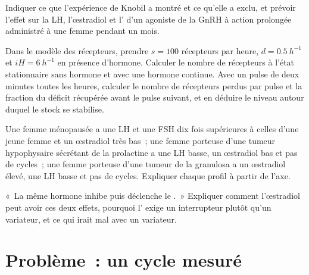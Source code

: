 \begin{exercise}[$\star\star$]\label{exo:b2:reproductive-hormones:9}
Indiquer ce que l'expérience de Knobil a montré et ce qu'elle a exclu,
et prévoir l'effet sur la LH, l'œstradiol et l' d'un agoniste
de la GnRH à action prolongée administré à une femme pendant un mois.
\end{exercise}

\begin{exercise}[$\star\star\star$]\label{exo:b2:reproductive-hormones:10}
Dans le modèle des récepteurs, prendre $s = 100$ récepteurs par heure,
$d =
\qty{0.5}{h^{-1}}$ et $iH = \qty{6}{h^{-1}}$ en présence d'hormone.
Calculer le nombre de récepteurs à l'état stationnaire sans hormone et
avec une hormone continue. Avec un pulse de deux minutes toutes les
heures, calculer le nombre de récepteurs perdus par pulse et la
fraction du déficit récupérée avant le pulse suivant, et en déduire le
niveau autour duquel le stock se stabilise.
\end{exercise}

\begin{exercise}[$\star\star\star$]\label{exo:b2:reproductive-hormones:11}
Une femme ménopausée a une LH et une FSH dix fois supérieures à celles
d'une jeune femme et un œstradiol très bas~; une femme porteuse d'une
tumeur hypophysaire sécrétant de la prolactine a une LH basse, un
œstradiol bas et pas de cycles~; une femme porteuse d'une tumeur de la
granulosa a un œstradiol élevé, une LH basse et pas de cycles.
Expliquer chaque profil à partir de l'axe.
\end{exercise}

\begin{exercise}[$\star\star\star$]\label{exo:b2:reproductive-hormones:12}
«~La même hormone inhibe puis déclenche le .~» Expliquer
comment l'œstradiol peut avoir ces deux effets, pourquoi l'
exige un interrupteur plutôt qu'un variateur, et ce qui irait mal avec
un variateur.
\end{exercise}

\section{Problème~: un cycle mesuré}

